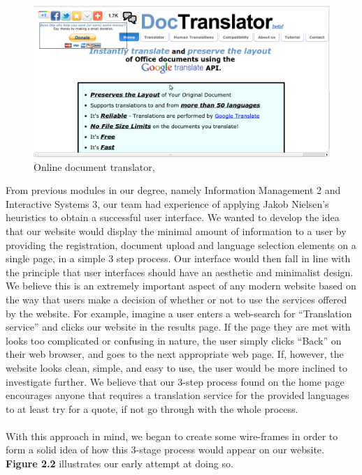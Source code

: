 \documentclass{l3proj}
\begin{document}
\begin{figure}
\begin{center}
\includegraphics[scale=0.4]{ex1doctrans}
\caption{Online document translator, \cite{od}}
\end{center}
\end{figure}

From previous modules in our degree, namely Information Management 2 and Interactive Systems 3, our team had experience
of applying Jakob Nielsen's heuristics to obtain a successful user interface. We
wanted to develop the idea that our website would display the minimal amount of
information to a user by providing the registration, document upload and
language selection elements on a single page, in a simple 3 step process. Our
interface would then fall in line with the principle that user interfaces should
have an aesthetic and minimalist design.
\cite{jakb} We believe
this is an extremely important aspect of any modern website based on the way
that users make a decision of whether or not to use the services offered by the
website. For example, imagine a user enters a web-search for ``Translation
service'' and clicks our website in the results page. If the page they are met
with looks too complicated or confusing in nature, the user simply clicks
``Back'' on their web browser, and goes to the next appropriate web page. If,
however, the website looks clean, simple, and easy to use, the user would be
more inclined to investigate further. We believe that our 3-step process found on
the home page encourages anyone that requires a translation service for the
provided languages to at least try for a quote, if not go through with the whole
process.\\
\\
With this approach in mind, we began to create some wire-frames in order to form
a solid idea of how this 3-stage process would appear on our website.
\textbf{Figure 2.2} illustrates our early attempt at doing so.
\end{document}
